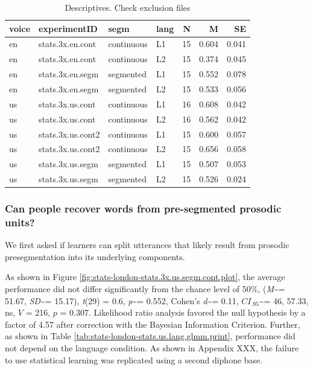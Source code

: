 \documentclass[]{article}
\newcommand{\T}{{\em t\/}}
\newcommand{\p}{{\em p\/}}
\newcommand{\M}{{\em M\/}}
\newcommand{\SD}{{\em SD\/}}
\newcommand{\D}{Cohen's {\em d\/}}
\newcommand{\CI}{$CI_{.95}$}
\begin{document}
\begin{table}

\caption{\label{tab:stats-london-descriptives}Descriptives. Check exclusion files}
\centering
\begin{tabular}[t]{llllrrr}
\toprule
voice & experimentID & segm & lang & N & M & SE\\
\midrule
en & stats.3x.en.cont & continuous & L1 & 15 & 0.604 & 0.041\\
en & stats.3x.en.cont & continuous & L2 & 15 & 0.374 & 0.045\\
en & stats.3x.en.segm & segmented & L1 & 15 & 0.552 & 0.078\\
en & stats.3x.en.segm & segmented & L2 & 15 & 0.533 & 0.056\\
us & stats.3x.us.cont & continuous & L1 & 16 & 0.608 & 0.042\\
\addlinespace
us & stats.3x.us.cont & continuous & L2 & 16 & 0.562 & 0.042\\
us & stats.3x.us.cont2 & continuous & L1 & 15 & 0.600 & 0.057\\
us & stats.3x.us.cont2 & continuous & L2 & 15 & 0.656 & 0.058\\
us & stats.3x.us.segm & segmented & L1 & 15 & 0.507 & 0.053\\
us & stats.3x.us.segm & segmented & L2 & 15 & 0.526 & 0.024\\
\bottomrule
\end{tabular}
\end{table}

\subsubsection{Can people recover words from pre-segmented prosodic
units?}\label{can-people-recover-words-from-pre-segmented-prosodic-units}

We first asked if learners can split utterances that likely result from
prosodic presegmentation into its underlying components.

As shown in Figure \ref{fig:stats-london-stats.3x.us.segm.cont.plot},
the average performance did not differ significantly from the chance
level of 50\%, (\M\textasciitilde{}= 51.67, \SD\textasciitilde{}=
15.17), \T(29) = 0.6, \p\textasciitilde{}= 0.552, \D\textasciitilde{}=
0.11, \CI\textasciitilde{}= 46, 57.33, ns, \(V\) = 216, \(p\) = 0.307.
Likelihood ratio analysis favored the null hypothesis by a factor of
4.57 after correction with the Bayesian Information Criterion. Further,
as shown in Table \ref{tab:stats-london-stats.us.lang.glmm.print},
performance did not depend on the language condition. As shown in
Appendix XXX, the failure to use statistical learning was replicated
using a second diphone base.
\end{document}
